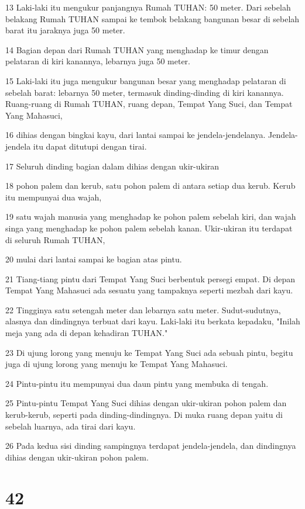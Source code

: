 \par 13 Laki-laki itu mengukur panjangnya Rumah TUHAN: 50 meter. Dari sebelah belakang Rumah TUHAN sampai ke tembok belakang bangunan besar di sebelah barat itu jaraknya juga 50 meter.
\par 14 Bagian depan dari Rumah TUHAN yang menghadap ke timur dengan pelataran di kiri kanannya, lebarnya juga 50 meter.
\par 15 Laki-laki itu juga mengukur bangunan besar yang menghadap pelataran di sebelah barat: lebarnya 50 meter, termasuk dinding-dinding di kiri kanannya. Ruang-ruang di Rumah TUHAN, ruang depan, Tempat Yang Suci, dan Tempat Yang Mahasuci,
\par 16 dihias dengan bingkai kayu, dari lantai sampai ke jendela-jendelanya. Jendela-jendela itu dapat ditutupi dengan tirai.
\par 17 Seluruh dinding bagian dalam dihias dengan ukir-ukiran
\par 18 pohon palem dan kerub, satu pohon palem di antara setiap dua kerub. Kerub itu mempunyai dua wajah,
\par 19 satu wajah manusia yang menghadap ke pohon palem sebelah kiri, dan wajah singa yang menghadap ke pohon palem sebelah kanan. Ukir-ukiran itu terdapat di seluruh Rumah TUHAN,
\par 20 mulai dari lantai sampai ke bagian atas pintu.
\par 21 Tiang-tiang pintu dari Tempat Yang Suci berbentuk persegi empat. Di depan Tempat Yang Mahasuci ada sesuatu yang tampaknya seperti mezbah dari kayu.
\par 22 Tingginya satu setengah meter dan lebarnya satu meter. Sudut-sudutnya, alasnya dan dindingnya terbuat dari kayu. Laki-laki itu berkata kepadaku, "Inilah meja yang ada di depan kehadiran TUHAN."
\par 23 Di ujung lorong yang menuju ke Tempat Yang Suci ada sebuah pintu, begitu juga di ujung lorong yang menuju ke Tempat Yang Mahasuci.
\par 24 Pintu-pintu itu mempunyai dua daun pintu yang membuka di tengah.
\par 25 Pintu-pintu Tempat Yang Suci dihias dengan ukir-ukiran pohon palem dan kerub-kerub, seperti pada dinding-dindingnya. Di muka ruang depan yaitu di sebelah luarnya, ada tirai dari kayu.
\par 26 Pada kedua sisi dinding sampingnya terdapat jendela-jendela, dan dindingnya dihias dengan ukir-ukiran pohon palem.

\chapter{42}

